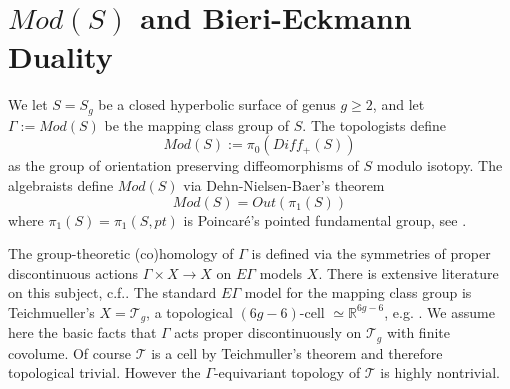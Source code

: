 \documentclass[12pt]{amsart}
\theoremstyle{definition}
\theoremstyle{remark}
\newcommand{\bR}{\mathbb{R}}
\newcommand{\sT}{\mathscr{T}}
\newcommand{\sZ}{\mathscr{Z}}
\begin{document}



\section{$Mod(S)$ and Bieri-Eckmann Duality}

We let $S=S_g$ be a closed hyperbolic surface of genus $g \geq 2$, and let $\Gamma:=Mod(S)$ be the mapping class group of $S$. The topologists define $$Mod(S):=\pi_0(Diff_+(S))$$ as the group of orientation preserving diffeomorphisms of $S$ modulo isotopy. The algebraists define $Mod(S)$ via Dehn-Nielsen-Baer's theorem $$Mod(S)=Out(\pi_1(S))$$ where $\pi_1(S)=\pi_1(S, pt)$ is Poincar\'e's pointed fundamental group, see \cite{primer}.
 
 
 








The group-theoretic (co)homology of $\Gamma$ is defined via the symmetries of proper discontinuous actions $\Gamma \times X \to X$ on $E\Gamma$ models $X$. There is extensive literature on this subject, c.f.\cite{Brown}. The standard $E\Gamma$ model for the mapping class group is Teichmueller's $X=\sT_g$, a topological $(6g-6)$-cell $\simeq \bR^{6g-6}$, e.g. \cite{hubbard}. We assume here the basic facts that $\Gamma$ acts proper discontinuously on $\sT_g$ with finite covolume. Of course $\sT$ is a cell by Teichmuller's theorem and therefore topological trivial. However the $\Gamma$-equivariant topology of $\sT$ is highly nontrivial.  %
\end{document}
